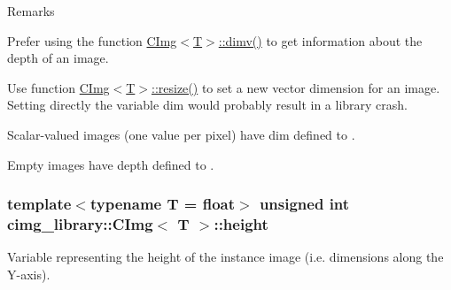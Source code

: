 \begin{DoxyRemark}{Remarks}

\begin{DoxyItemize}
\item Prefer using the function \hyperlink{structcimg__library_1_1_c_img_ad30f8300f32a94a80e1e06c84a45de49}{C\-Img$<$\-T$>$\-::dimv()} to get information about the depth of an image.
\item Use function \hyperlink{structcimg__library_1_1_c_img_a84970d569f01fc5f9370d9cc84428903}{C\-Img$<$\-T$>$\-::resize()} to set a new vector dimension for an image. Setting directly the variable {\ttfamily dim} would probably result in a library crash.
\item Scalar-\/valued images (one value per pixel) have {\ttfamily dim} defined to {}.
\item Empty images have {\ttfamily depth} defined to {}. 
\end{DoxyItemize}
\end{DoxyRemark}
\hypertarget{structcimg__library_1_1_c_img_a30d575fd18ae525e507315de71b4806a}{
\subsubsection[{height}]{\setlength{\rightskip}{0pt plus 5cm}template$<$typename T = float$>$ unsigned int {\bf cimg\-\_\-library\-::\-C\-Img}$<$ T $>$\-::height}}\label{structcimg__library_1_1_c_img_a30d575fd18ae525e507315de71b4806a}


Variable representing the height of the instance image (i.\-e. dimensions along the Y-\/axis). 

